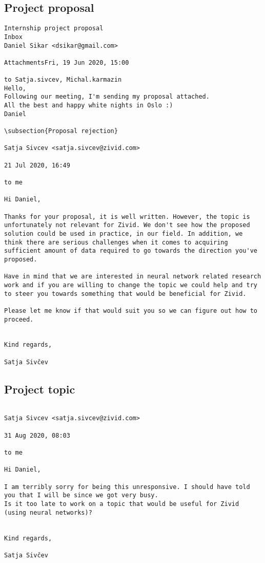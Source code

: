 \subsection{Project proposal}
\begin{verbatim}
Internship project proposal
Inbox
Daniel Sikar <dsikar@gmail.com>
	
AttachmentsFri, 19 Jun 2020, 15:00
	
to Satja.sivcev, Michal.karmazin
Hello,
Following our meeting, I'm sending my proposal attached.
All the best and happy white nights in Oslo :)
Daniel

\subsection{Proposal rejection}

Satja Sivcev <satja.sivcev@zivid.com>
	
21 Jul 2020, 16:49
	
to me

Hi Daniel,

Thanks for your proposal, it is well written. However, the topic is unfortunately not relevant for Zivid. We don't see how the proposed solution could be used in practice, in our field. In addition, we think there are serious challenges when it comes to acquiring sufficient amount of data required to go towards the direction you've proposed.

Have in mind that we are interested in neural network related research work and if you are willing to change the topic we could help and try to steer you towards something that would be beneficial for Zivid.

Please let me know if that would suit you so we can figure out how to proceed.


Kind regards,

Satja Sivčev

\end{verbatim}

\subsection{Project topic}
\begin{verbatim}

Satja Sivcev <satja.sivcev@zivid.com>
	
31 Aug 2020, 08:03
	
to me

Hi Daniel,

I am terribly sorry for being this unresponsive. I should have told you that I will be since we got very busy.
Is it too late to work on a topic that would be useful for Zivid (using neural networks)?


Kind regards,

Satja Sivčev


\end{verbatim}
